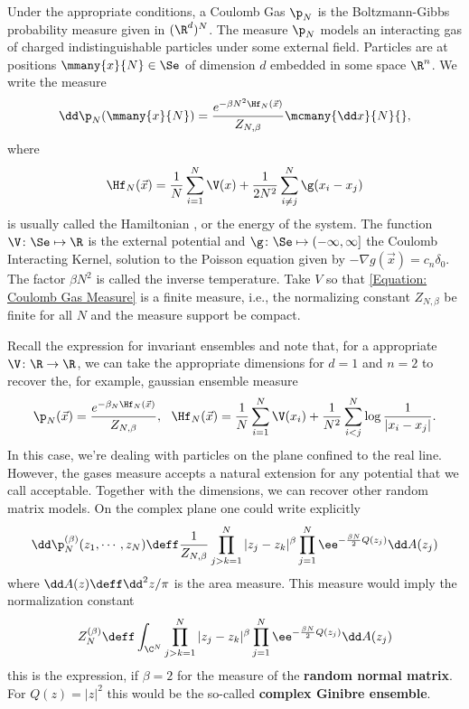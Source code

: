 Under the appropriate conditions, a Coulomb Gas $\p_N$ is the Boltzmann-Gibbs probability measure given in $(\R^d)^N$. The measure $\p_N$ models an interacting gas of charged indistinguishable particles under some external field. Particles are at positions $\mmany{x}{N} \in \Se$ of dimension $d$ embedded in some space $\R^n$. We write the measure 
\begin{equation}
	\dd \p_N(\mmany{x}{N}) = \frac{e^{-\beta N^2 \Hf_N(\vec{x})}}{Z_{N,\beta}} \mcmany{\dd x}{N}{},
	\label{Equation: Coulomb Gas Measure}
\end{equation}
where $$\Hf_N(\vec{x}) = \frac{1}{N} \sum_{i = 1}^{N} \V(x) + \frac{1}{2N^2} \sum_{i \neq j}^{N} \g(x_i - x_j)$$ is usually called the Hamiltonian , or the energy of the system. The function $\V \colon \Se \mapsto \R$ is the external potential and $\g \colon \Se \mapsto (-\infty, \infty]$ the Coulomb Interacting Kernel, solution to the Poisson equation given by $- \nabla g(\vec{x}) = c_n\delta_0$. The factor $\beta N^2$ is called the inverse temperature. Take $V$ so that \eqref{Equation: Coulomb Gas Measure} is a finite measure, i.e., the normalizing constant $Z_{N, \beta}$ be finite for all $N$ and the measure support be compact.

Recall the expression for invariant ensembles and note that, for a appropriate $\V \colon \R \rightarrow \R$, we can take the appropriate dimensions for $d=1$ and $n = 2$ to recover the, for example, gaussian ensemble measure
\begin{equation}
	\p_N(\vec{x}) = \frac{e^{-\beta_N \Hf_N(\vec{x})}}{Z_{N,\beta}}, \ \ \Hf_N(\vec{x}) = \frac{1}{N} \sum_{i = 1}^{N} \V(x_i) + \frac{1}{N^2} \sum_{i < j}^{N} \log{\frac{1}{|x_i - x_j|}}.
\end{equation}
In this case, we're dealing with particles on the plane confined to the real line. However, the gases measure accepts a natural extension for any potential that we call acceptable. Together with the dimensions, we can recover other random matrix models. On the complex plane one could write explicitly
\begin{equation}
	\dd \p_N^{(\beta)} (z_1, \cdots, z_N) \deff \frac{1}{Z_{N,\beta}} \prod_{j > k = 1}^{N} |z_j - z_k|^\beta \prod_{j=1}^{N} \ee^{- \frac{\beta N}{2} Q(z_j)} \dd A(z_j)
\end{equation}
where $\dd A(z) \deff \dd^2 z / \pi$ is the area measure. This measure would imply the normalization constant
\begin{equation}
	Z_N^{(\beta)} \deff \int_{\C^N} \prod_{j > k = 1}^{N} |z_j - z_k|^\beta \prod_{j=1}^{N} \ee^{- \frac{\beta N}{2} Q(z_j)} \dd A(z_j)
\end{equation}
this is the expression, if $\beta = 2$ for the measure of the \textbf{random normal matrix}. For $Q(z) = |z|^2$ this would be the so-called \textbf{complex Ginibre ensemble}.

